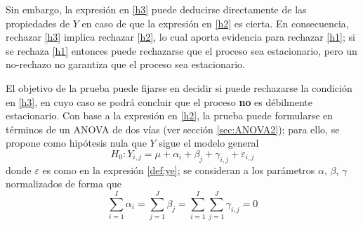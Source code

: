 \documentclass[12pt,letterpaper]{book}
\begin{document}
Sin embargo, la expresión en \ref{h3} puede deducirse directamente de las propiedades de $Y$ en caso de que la expresión en \ref{h2} es cierta. 
%
En consecuencia, rechazar \ref{h3} implica rechazar \ref{h2}, lo cual aporta evidencia para rechazar \ref{h1}; si se rechaza \ref{h1} entonces puede rechazarse que el proceso sea estacionario, pero un no-rechazo no garantiza que el proceso sea estacionario.

El objetivo de la prueba puede fijarse en decidir si puede rechazarse la condición en \ref{h3}, en cuyo caso se podrá concluir que el proceso \textbf{no} es débilmente estacionario.
%
Con base a la expresión en \ref{h2}, la prueba puede formularse en términos de un ANOVA de dos vías (ver sección \ref{sec:ANOVA2}); para ello, se propone como hipótesis nula que $Y$ sigue el modelo general
%
\begin{equation}
H_0 : Y_{i,j} = \mu + \alpha_i + \beta_j + \gamma_{i,j} + \varepsilon_{i,j}
\end{equation}
%
donde $\varepsilon$ es como en la expresión \ref{def:ye}; se consideran a los parámetros $\alpha$, $\beta$, $\gamma$ normalizados de forma que
\begin{equation}
\sum_{i=1}^I \alpha_i = \sum_{j=1}^J \beta_j = \sum_{i=1}^I \sum_{j=1}^J \gamma_{i,j} = 0
\end{equation}
\end{document}
